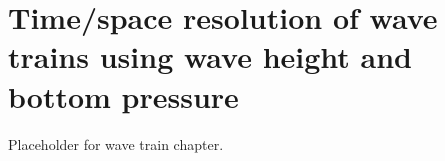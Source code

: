 \setchapterpreamble[u]{\margintoc}
\chapter{Time/space resolution of wave trains using wave height and bottom pressure}

Placeholder for wave train chapter.
